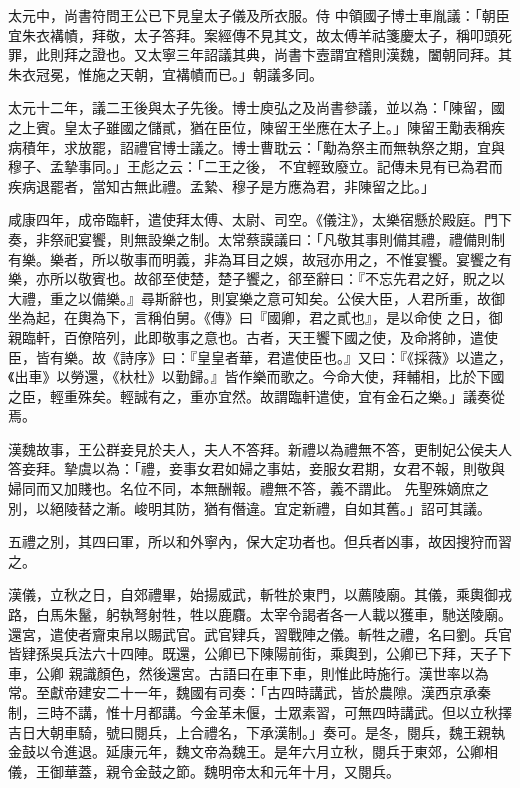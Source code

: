 \begin{pinyinscope}
 太元中，尚書符問王公已下見皇太子儀及所衣服。侍
 中領國子博士車胤議：「朝臣宜朱衣褠幘，拜敬，太子答拜。案經傳不見其文，故太傅羊祜箋慶太子，稱叩頭死罪，此則拜之證也。又太寧三年詔議其典，尚書卞壼謂宜稽則漢魏，闔朝同拜。其朱衣冠冕，惟施之天朝，宜褠幘而已。」朝議多同。



 太元十二年，議二王後與太子先後。博士庾弘之及尚書參議，並以為：「陳留，國之上賓。皇太子雖國之儲貳，猶在臣位，陳留王坐應在太子上。」陳留王勱表稱疾病積年，求放罷，詔禮官博士議之。博士曹耽云：「勱為祭主而無執祭之期，宜與穆子、孟摯事同。」王彪之云：「二王之後，
 不宜輕致廢立。記傳未見有已為君而疾病退罷者，當知古無此禮。孟縶、穆子是方應為君，非陳留之比。」



 咸康四年，成帝臨軒，遣使拜太傅、太尉、司空。《儀注》，太樂宿懸於殿庭。門下奏，非祭祀宴饗，則無設樂之制。太常蔡謨議曰：「凡敬其事則備其禮，禮備則制有樂。樂者，所以敬事而明義，非為耳目之娛，故冠亦用之，不惟宴饗。宴饗之有樂，亦所以敬賓也。故郤至使楚，楚子饗之，郤至辭曰：『不忘先君之好，貺之以大禮，重之以備樂。』尋斯辭也，則宴樂之意可知矣。公侯大臣，人君所重，故御坐為起，在輿為下，言稱伯舅。《傳》曰『國卿，君之貳也』，是以命使
 之日，御親臨軒，百僚陪列，此即敬事之意也。古者，天王饗下國之使，及命將帥，遣使臣，皆有樂。故《詩序》曰：『皇皇者華，君遣使臣也。』又曰：『《採薇》以遣之，《出車》以勞還，《杕杜》以勤歸。』皆作樂而歌之。今命大使，拜輔相，比於下國之臣，輕重殊矣。輕誠有之，重亦宜然。故謂臨軒遣使，宜有金石之樂。」議奏從焉。



 漢魏故事，王公群妾見於夫人，夫人不答拜。新禮以為禮無不答，更制妃公侯夫人答妾拜。摯虞以為：「禮，妾事女君如婦之事姑，妾服女君期，女君不報，則敬與婦同而又加賤也。名位不同，本無酬報。禮無不答，義不謂此。
 先聖殊嫡庶之別，以絕陵替之漸。峻明其防，猶有僭違。宜定新禮，自如其舊。」詔可其議。



 五禮之別，其四曰軍，所以和外寧內，保大定功者也。但兵者凶事，故因搜狩而習之。



 漢儀，立秋之日，自郊禮畢，始揚威武，斬牲於東門，以薦陵廟。其儀，乘輿御戎路，白馬朱鬣，躬執弩射牲，牲以鹿麛。太宰令謁者各一人載以獲車，馳送陵廟。還宮，遣使者齎束帛以賜武官。武官肄兵，習戰陣之儀。斬牲之禮，名曰劉。兵官皆肄孫吳兵法六十四陣。既還，公卿已下陳陽前街，乘輿到，公卿已下拜，天子下車，公卿
 親識顏色，然後還宮。古語曰在車下車，則惟此時施行。漢世率以為常。至獻帝建安二十一年，魏國有司奏：「古四時講武，皆於農隙。漢西京承秦制，三時不講，惟十月都講。今金革未偃，士眾素習，可無四時講武。但以立秋擇吉日大朝車騎，號曰閱兵，上合禮名，下承漢制。」奏可。是冬，閱兵，魏王親執金鼓以令進退。延康元年，魏文帝為魏王。是年六月立秋，閱兵于東郊，公卿相儀，王御華蓋，親令金鼓之節。魏明帝太和元年十月，又閱兵。




\end{pinyinscope}

